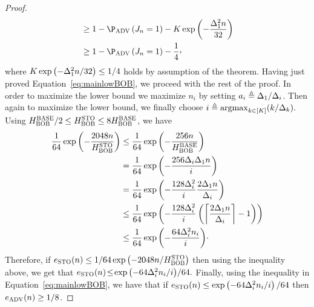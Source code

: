 \begin{proof}
\begin{align*}
	&    \geq
	1-
	\Pro_{\advPro}\left(\recomArm_\timeHorizon=1\right)
	- \nArms\exp\left(-\frac{\gap^2_1\timeHorizon}{32}
	\right)\\
	&    \geq
	1-
	\Pro_{\advPro}\left(\recomArm_\timeHorizon=1\right)
	- \frac14\CommaBin
	\end{align*}
	where  %
	$K\exp\left(-\Delta^2_1n/32\right)\leq 1/4$ 
	holds by assumption of the theorem.    
	Having just proved Equation~\ref{eq:mainlowBOB}, we proceed with 
	the rest of the proof.
	In order to maximize the lower bound we maximize $n_i$ by 
	setting $a_i\triangleq\Delta_1/ \Delta_i$.
	Then again to maximize the lower bound, we finally 
	choose $i \triangleq \mathrm{argmax}_{k\in[K]} (k/\Delta_k).$
	Using $H_{{\normalfont \textsc{{BOB}}}}^{\textsc{BASE}}/2\leq H_{{\normalfont \textsc{{BOB}}}}^{\textsc{STO}}\leq8H_{{\normalfont \textsc{{BOB}}}}^{\textsc{BASE}}$, we have 
	\begin{align*}
	\frac{1}{64}\exp\left(-\frac{2048n}
	{H_{{\normalfont \textsc{{BOB}}}}^{\textsc{STO}}}\right)
	&\leq
	\frac{1}{64}\exp\left(-\frac{256n}{H_{{\normalfont \textsc{{BOB}}}}^{\textsc{BASE}}}\right)\\
	&= \frac{1}{64}\exp\left(-\frac{256\Delta_{i}\Delta_1n}{i}\right)\\
	&= \frac{1}{64}\exp\left(-\frac{128\Delta^2_{i}}{i}\frac{{2\Delta_1}n}{\Delta_i}\right)\\
	&\leq \frac{1}{64}\exp\left(-\frac{128\Delta^2_{i}}{i}
	\left(\left\lceil\frac{2\Delta_1n}{\Delta_i}\right\rceil-1\right)\right)\\
	&\leq
	\frac{1}{64}\exp\left(-\frac{64\Delta^2_{i}n_i}{i}\right)\!\cdot
	\end{align*}
	Therefore,     
	if $e_{\textsc{STO}}(n)
	\leq 
	1/64\exp\left(-2048n/H_{{\normalfont \textsc{{BOB}}}}^{\textsc{STO}}\right)$ 
	then using the inequality above, we get that 
	$e_{\textsc{STO}}(n)\!\leq\!\exp\left(-64\Delta^2_{i}n_i/i\right)\!/64.$        
	Finally, using the inequality in Equation~\ref{eq:mainlowBOB},    we have that
	if $e_{\textsc{STO}}(n)
	\leq 
	\exp\left(-64\Delta^2_{i}n_i/i\right)/64$
	then  $e_{\textsc{ADV}}(n)\geq 1/8$.
	
	
	

\end{proof}
